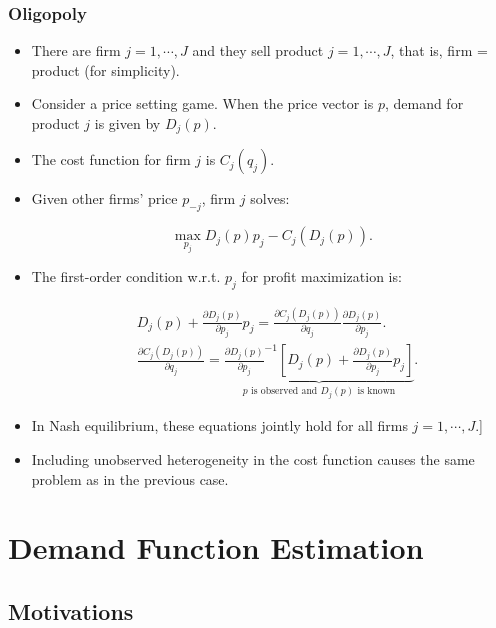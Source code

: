\documentclass[]{book}
\begin{document}
\subsection{Oligopoly}\label{oligopoly}

\begin{itemize}
\item
  There are firm \(j = 1, \cdots, J\) and they sell product
  \(j = 1, \cdots, J\), that is, firm = product (for simplicity).
\item
  Consider a price setting game. When the price vector is \(p\), demand
  for product \(j\) is given by \(D_j(p)\).
\item
  The cost function for firm \(j\) is \(C_j(q_j)\).
\item
  Given other firms' price \(p_{-j}\), firm \(j\) solves:

  \begin{equation}
  \max_{p_j} D_j(p) p_j - C_j(D_j(p)).
  \end{equation}
\item
  The first-order condition w.r.t. \(p_j\) for profit maximization is:

  \begin{equation}
  \begin{split}
  &D_j(p) + \frac{\partial D_j(p)}{\partial p_j} p_j = \frac{\partial C_j(D_j(p))}{\partial q_j} \frac{\partial D_j(p)}{\partial p_j}.\\
  &\frac{\partial C_j(D_j(p))}{\partial q_j} = \underbrace{\frac{\partial D_j(p)}{\partial p_j}^{-1}[D_j(p) + \frac{\partial D_j(p)}{\partial p_j} p_j ]}_{\text{$p$ is observed and $D_j(p)$ is known}}.
  \end{split}
  \end{equation}
\item
  In Nash equilibrium, these equations jointly hold for all firms
  \(j = 1, \cdots, J\).{]}
\item
  Including unobserved heterogeneity in the cost function causes the
  same problem as in the previous case.
\end{itemize}

\chapter{Demand Function Estimation}\label{demand}

\section{Motivations}\label{motivations-1}
\end{document}
